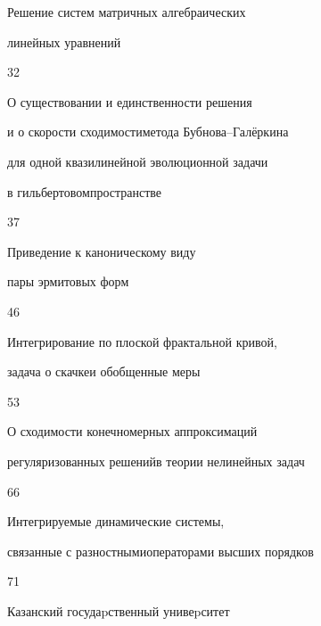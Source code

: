 

{ Решение систем матричных алгебраических 


линейных уравнений}{32}




{О существовании и единственности решения 


и о скорости сходимости\newline метода Бубнова--Гал\"еркина 


для одной квазилинейной эволюционной задачи 


в гильбертовом\newline пространстве}{37}




{Приведение к каноническому виду 


пары эрмитовых форм}{46}




{Интегрирование по плоской фрактальной кривой,  


задача о скачке\newline и обобщенные меры}{53}




{О сходимости конечномерных аппроксимаций 


регуляризованных решений\newline в теории нелинейных задач}{66}




{Интегрируемые динамические системы, 


связанные с разностными\newline операторами высших порядков}{71}











\vfill


\noindent\raisebox{2pt}{\copyright} Казанский госудаpственный унивеpситет





